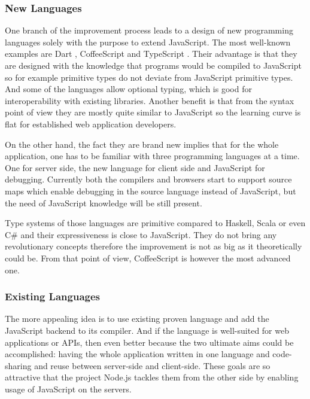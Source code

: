 \documentclass[12pt,a4paper]{report}
\begin{document}
\subsubsection*{New Languages} 

One branch of the improvement process leads to a design of new programming languages solely with the purpose to extend JavaScript. The most well-known examples are Dart \cite{Dart}, CoffeeScript \cite{CoffeeScript} and TypeScript \cite{TypeScript}. Their advantage is that they are designed with the knowledge that programs would be compiled to JavaScript so for example primitive types do not deviate from JavaScript primitive types. And some of the languages allow optional typing, which is good for interoperability with existing libraries. Another benefit is that from the syntax point of view they are mostly quite similar to JavaScript so the learning curve is flat for established web application developers. 

On the other hand, the fact they are brand new implies that for the whole application, one has to be familiar with three programming languages at a time. One for server side, the new language for client side and JavaScript for debugging. Currently both the compilers and browsers start to support source maps which enable debugging in the source language instead of JavaScript, but the need of JavaScript knowledge will be still present. 

Type systems of those languages are primitive compared to Haskell, Scala or even C\# and their expressiveness is close to JavaScript. They do not bring any revolutionary concepts therefore the improvement is not as big as it theoretically could be. From that point of view, CoffeeScript is however the most advanced one.

\subsubsection*{Existing Languages} 

The more appealing idea is to use existing proven language and add the JavaScript backend to its compiler. And if the language is well-suited for web applications or APIs, then even better because the two ultimate aims could be accomplished: having the whole application written in one language and code-sharing and reuse between server-side and client-side. These goals are so attractive that the project Node.js \cite{NodeJs} tackles them from the other side by enabling usage of JavaScript on the servers.
\end{document}
